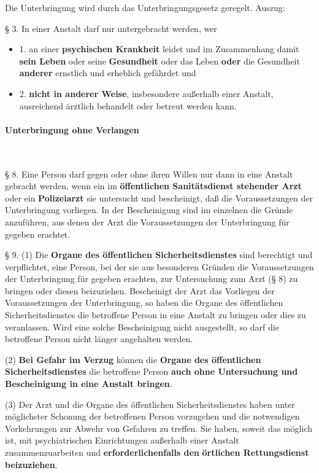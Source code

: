 
Die Unterbringung wird durch das
Unterbringungsgesetz geregelt. Auszug:

{\S} 3. In einer Anstalt darf nur untergebracht werden, wer
\begin{itemize}
    \item 1. an einer \textbf{psychischen Krankheit} leidet und im Zusammenhang
damit \textbf{sein Leben} oder seine \textbf{Gesundheit} oder das Leben
\textbf{oder} die Gesundheit \textbf{anderer} ernstlich und erheblich
gefährdet und
\item 2. \textbf{nicht in anderer Weise}, insbesondere außerhalb einer
Anstalt, ausreichend ärztlich behandelt oder betreut werden kann.
\end{itemize}




\paragraph{Unterbringung ohne Verlangen}~

{\S} 8. Eine Person darf gegen oder ohne ihren Willen nur dann in eine
Anstalt gebracht werden, wenn ein im \textbf{öffentlichen
Sanitätsdienst stehender Arzt} oder ein \textbf{Polizeiarzt} sie
untersucht und bescheinigt, daß die Voraussetzungen der
Unterbringung vorliegen. In der Bescheinigung sind im einzelnen die
Gründe anzuführen, aus denen der Arzt die Voraussetzungen der
Unterbringung für gegeben erachtet.

{\S} 9. (1) Die \textbf{Organe des öffentlichen Sicherheitsdienstes}
sind berechtigt und verpflichtet, eine Person, bei der sie aus
besonderen Gründen die Voraussetzungen der Unterbringung für
gegeben erachten, zur Untersuchung zum Arzt ({\S} 8) zu bringen oder
diesen beizuziehen. Bescheinigt der Arzt das Vorliegen der
Voraussetzungen der Unterbringung, so haben die Organe des
öffentlichen Sicherheitsdienstes die betroffene Person in eine
Anstalt zu bringen oder dies zu veranlassen. Wird eine solche
Bescheinigung nicht ausgestellt, so darf die betroffene Person nicht
länger angehalten werden.

(2) \textbf{Bei Gefahr im Verzug} können die \textbf{Organe des
öffentlichen Sicherheitsdienstes} die betroffene Person \textbf{auch
ohne Untersuchung und Bescheinigung in eine Anstalt bringen}.

(3) Der Arzt und die Organe des öffentlichen Sicherheitsdienstes haben
unter möglichster Schonung der betroffenen Person vorzugehen und die
notwendigen Vorkehrungen zur Abwehr von Gefahren zu treffen. Sie haben,
soweit das möglich ist, mit psychiatrischen Einrichtungen
außerhalb einer Anstalt zusammenzuarbeiten und
\textbf{erforderlichenfalls den }\textbf{örtlichen Rettungsdienst
beizuziehen}.

